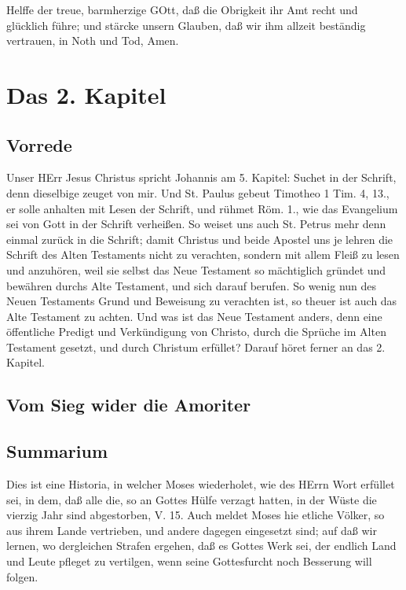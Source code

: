 Helffe der treue, barmherzige GOtt, daß die Obrigkeit ihr Amt recht und glücklich führe; und stärcke unsern Glauben, daß wir ihm allzeit beständig vertrauen, in Noth und Tod, Amen.

\chapter{Das 2. Kapitel}

\section{Vorrede}

Unser HErr Jesus Christus spricht Johannis am 5. Kapitel: Suchet in der Schrift, denn dieselbige zeuget von mir. Und St. Paulus gebeut Timotheo 1 Tim. 4, 13., er solle anhalten mit Lesen der Schrift, und rühmet Röm. 1., wie das Evangelium sei von Gott in der Schrift verheißen. So weiset uns auch St. Petrus mehr denn einmal zurück in die Schrift; damit Christus und beide Apostel uns je lehren die Schrift des Alten Testaments nicht zu verachten, sondern mit allem Fleiß zu lesen und anzuhören, weil sie selbst das Neue Testament so mächtiglich gründet und bewähren durchs Alte Testament, und sich darauf berufen. So wenig nun des Neuen Testaments Grund und Beweisung zu verachten ist, so theuer ist auch das Alte Testament zu achten. Und was ist das Neue Testament anders, denn eine öffentliche Predigt und Verkündigung von Christo, durch die Sprüche im Alten Testament gesetzt, und durch Christum erfüllet? Darauf höret ferner an das 2. Kapitel.

\section{Vom Sieg wider die Amoriter}

\section{Summarium}

Dies ist eine Historia, in welcher Moses wiederholet, wie des HErrn Wort erfüllet sei, in dem, daß alle die, so an Gottes Hülfe verzagt hatten, in der Wüste die vierzig Jahr sind abgestorben, V. 15. Auch meldet Moses hie etliche Völker, so aus ihrem Lande vertrieben, und andere dagegen eingesetzt sind; auf daß wir lernen, wo dergleichen Strafen ergehen, daß es Gottes Werk sei, der endlich Land und Leute pfleget zu vertilgen, wenn seine Gottesfurcht noch Besserung will folgen.


